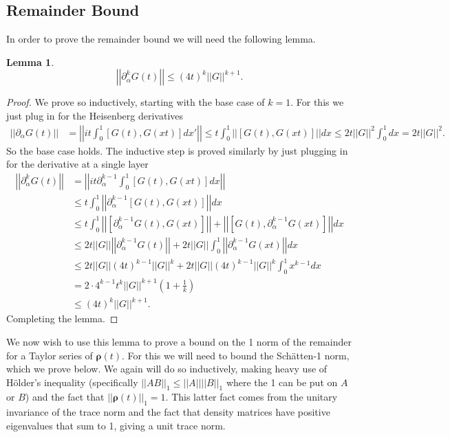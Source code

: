 \documentclass[
 amsmath,amssymb,
 aps,
onecolumn, 
nofootinbib]{revtex4-2}
\newtheorem{lemma}[theorem]{Lemma}
\newcommand{\norm}[1]{\left|\left| #1 \right|\right|}
\begin{document}
\subsection{Remainder Bound}
In order to prove the remainder bound we will need the following lemma. 
\begin{lemma}
    \begin{equation}
         \norm{\partial_\alpha^k G( t)} \le (4 t)^k \norm{G}^{k + 1}.
    \end{equation}
\end{lemma} \label{lem:remainder_bound_interaction_norm}
\begin{proof}
    We prove so inductively, starting with the base case of $k = 1$. For this we just plug in for the Heisenberg derivatives
    \begin{align}
        \norm{\partial_\alpha G( t) } &=  \norm{i  t \int_0^1 [G(t), G(x t)] dx'} \le t \int_0^1  \norm{[G(t), G(x t)]} dx  \le 2 t \norm{G}^2 \int_0^1   dx = 2 t \norm{G}^2.
    \end{align}
    So the base case holds. The inductive step is proved similarly by just plugging in for the derivative at a single layer
    \begin{align}
        \norm{\partial_\alpha^k G( t)} &= \norm{i  t \partial_\alpha^{k - 1}\int_0^1[G(t), G( x t)] dx } \\
        &\le t  \int_0^1 \norm{\partial_\alpha^{k - 1} [G(t), G( x t)]} dx  \\
        &\le t  \int_0^1  \norm{[\partial_\alpha^{k-1} G( t), G( x t)]} + \norm{[G(t) , \partial_{\alpha}^{k-1} G(x t)]} dx \\
        &\le 2 t \norm{G} \norm{\partial_{\alpha}^{k -1} G(t)} + 2 t \norm{G} \int_0^1 \norm{\partial_{\alpha}^{k - 1} G(x t)} d x \\
        &\le 2 t \norm{G} (4 t)^{k - 1} \norm{G}^k + 2t \norm{G} (4 t)^{k -1} \norm{G}^{k} \int_0^1 x^{k - 1} d x \\
        &= 2 \cdot 4^{k - 1} t^{k} \norm{G}^{k + 1} \left(1 + \frac{1}{k} \right) \\
        &\le  (4 t)^k \norm{G}^{k + 1}.
    \end{align}
    Completing the lemma.
\end{proof}
We now wish to use this lemma to prove a bound on the 1 norm of the remainder for a Taylor series of $\boldsymbol{\rho}(t)$. For this we will need to bound the Schätten-1 norm, which we prove below.  We again will do so inductively, making heavy use of Hölder's inequality (specifically $\norm{A B}_1 \le \norm{A} \norm{B}_1$ where the 1 can be put on $A$ or $B$) and the fact that $\norm{\boldsymbol{\rho}(t)}_1 = 1$. This latter fact comes from the unitary invariance of the trace norm and the fact that density matrices have positive eigenvalues that sum to 1, giving a unit trace norm. 
\end{document}
